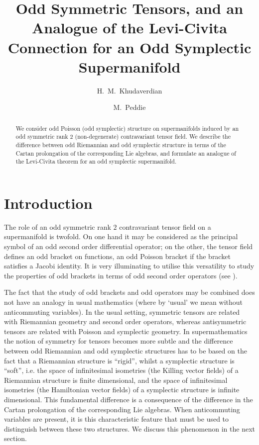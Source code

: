 \documentclass[12pt,reqno,a4paper]{amsart}
\title[Odd symmetric tensors...]
{Odd Symmetric Tensors, and an Analogue of the Levi-Civita Connection for an Odd Symplectic Supermanifold}
\author{H.~M.~Khudaverdian}
\author{M.~Peddie}
\theoremstyle{definition}
\begin{document}
\maketitle

\begin{abstract}
We consider odd Poisson (odd symplectic) structure
on supermanifolds induced by an odd symmetric rank $2$ (non-degenerate)
contravariant tensor field. We describe the
  difference between odd Riemannian and odd symplectic structure
in terms of the Cartan prolongation of the corresponding Lie algebras,
and formulate an analogue of the Levi-Civita theorem
 for an odd symplectic supermanifold.
\end{abstract}

\section{Introduction}
The role of an odd symmetric rank $2$ contravariant tensor field
on a supermanifold is twofold. On one hand it
may be considered as the principal symbol of an odd second order
differential operator; on the other, the tensor field
defines an odd
bracket on functions, an odd Poisson bracket if the bracket
 satisfies a Jacobi identity. It is very illuminating to utilise
 this versatility to study the properties of odd brackets in terms
 of odd second order operators (see \cite{KhVor1, KhVor2}).

The fact that the study of odd brackets and odd operators may be
combined does not have an analogy in usual mathematics (where by
`usual' we mean without anticommuting variables). In the usual
setting, symmetric tensors are related with Riemannian geometry and
second order operators, whereas antisymmetric tensors are related
with Poisson and symplectic geometry. In supermathematics the notion
of symmetry for tensors becomes more subtle and the difference between
odd Riemannian and odd symplectic structures has to be based on the
fact that a Riemannian structure is ``rigid'', whilst a symplectic
structure is ``soft'', i.e. the space of infinitesimal isometries
(the Killing vector fields) of a Riemannian structure is finite dimensional,
and the space of infinitesimal isometries (the Hamiltonian vector fields)
of a symplectic structure is infinite dimensional. This fundamental
difference is a consequence of the difference in the Cartan prolongation
of the corresponding Lie algebras. When anticommuting variables are present,
it is this characteristic feature that must be used to distinguish between these two
structures. We discuss this phenomenon in the next section.
\end{document}
